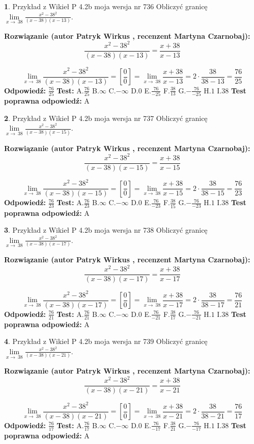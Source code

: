\documentclass[12pt, a4paper]{article}
\theoremstyle{definition} %
\newtheorem{zad}{}
\newcommand{\zadStart}[1]{\begin{zad}#1\newline}
\newcommand{\zadStop}{\end{zad}}
\newcommand{\rozwStart}[2]{\noindent \textbf{Rozwiązanie (autor #1 , recenzent #2): }\newline}
\newcommand{\rozwStop}{\newline}
\newcommand{\odpStart}{\noindent \textbf{Odpowiedź:}\newline}
\newcommand{\odpStop}{\newline}
\newcommand{\testStart}{\noindent \textbf{Test:}\newline}
\newcommand{\testStop}{\newline}
\newcommand{\kluczStart}{\noindent \textbf{Test poprawna odpowiedź:}\newline}
\newcommand{\kluczStop}{\newline}
\begin{document}
\zadStart{Przykład z Wikieł P 4.2b moja wersja nr 736}
Obliczyć granicę $\lim\limits_{x\to\ 38}\frac{x^{2}-38^{2}}{(x-38)(x-13)}$.
\zadStop
\rozwStart{Patryk Wirkus}{Martyna Czarnobaj}
$$\frac{x^{2}-38^{2}}{(x-38)(x-13)}=\frac{x+38}{x-13}$$

$$\lim\limits_{x\to\ 38}\frac{x^{2}-38^{2}}{(x-38)(x-13)}=[\frac{0}{0}]=\lim\limits_{x\to\ 38}\frac{x+38}{x-13}=2 \cdot \frac{38}{38-13} = \frac{76}{25}$$
\rozwStop
\odpStart
$\frac{76}{25}$
\odpStop
\testStart
A.$\frac{76}{25}$
B.$\infty$
C.$-\infty$
D.$0$
E.$\frac{76}{-25}$
F.$\frac{38}{13}$
G.$-\frac{76}{-25}$
H.$1$
I.$38$
\testStop
\kluczStart
A
\kluczStop



\zadStart{Przykład z Wikieł P 4.2b moja wersja nr 737}
Obliczyć granicę $\lim\limits_{x\to\ 38}\frac{x^{2}-38^{2}}{(x-38)(x-15)}$.
\zadStop
\rozwStart{Patryk Wirkus}{Martyna Czarnobaj}
$$\frac{x^{2}-38^{2}}{(x-38)(x-15)}=\frac{x+38}{x-15}$$

$$\lim\limits_{x\to\ 38}\frac{x^{2}-38^{2}}{(x-38)(x-15)}=[\frac{0}{0}]=\lim\limits_{x\to\ 38}\frac{x+38}{x-15}=2 \cdot \frac{38}{38-15} = \frac{76}{23}$$
\rozwStop
\odpStart
$\frac{76}{23}$
\odpStop
\testStart
A.$\frac{76}{23}$
B.$\infty$
C.$-\infty$
D.$0$
E.$\frac{76}{-23}$
F.$\frac{38}{15}$
G.$-\frac{76}{-23}$
H.$1$
I.$38$
\testStop
\kluczStart
A
\kluczStop



\zadStart{Przykład z Wikieł P 4.2b moja wersja nr 738}
Obliczyć granicę $\lim\limits_{x\to\ 38}\frac{x^{2}-38^{2}}{(x-38)(x-17)}$.
\zadStop
\rozwStart{Patryk Wirkus}{Martyna Czarnobaj}
$$\frac{x^{2}-38^{2}}{(x-38)(x-17)}=\frac{x+38}{x-17}$$

$$\lim\limits_{x\to\ 38}\frac{x^{2}-38^{2}}{(x-38)(x-17)}=[\frac{0}{0}]=\lim\limits_{x\to\ 38}\frac{x+38}{x-17}=2 \cdot \frac{38}{38-17} = \frac{76}{21}$$
\rozwStop
\odpStart
$\frac{76}{21}$
\odpStop
\testStart
A.$\frac{76}{21}$
B.$\infty$
C.$-\infty$
D.$0$
E.$\frac{76}{-21}$
F.$\frac{38}{17}$
G.$-\frac{76}{-21}$
H.$1$
I.$38$
\testStop
\kluczStart
A
\kluczStop



\zadStart{Przykład z Wikieł P 4.2b moja wersja nr 739}
Obliczyć granicę $\lim\limits_{x\to\ 38}\frac{x^{2}-38^{2}}{(x-38)(x-21)}$.
\zadStop
\rozwStart{Patryk Wirkus}{Martyna Czarnobaj}
$$\frac{x^{2}-38^{2}}{(x-38)(x-21)}=\frac{x+38}{x-21}$$

$$\lim\limits_{x\to\ 38}\frac{x^{2}-38^{2}}{(x-38)(x-21)}=[\frac{0}{0}]=\lim\limits_{x\to\ 38}\frac{x+38}{x-21}=2 \cdot \frac{38}{38-21} = \frac{76}{17}$$
\rozwStop
\odpStart
$\frac{76}{17}$
\odpStop
\testStart
A.$\frac{76}{17}$
B.$\infty$
C.$-\infty$
D.$0$
E.$\frac{76}{-17}$
F.$\frac{38}{21}$
G.$-\frac{76}{-17}$
H.$1$
I.$38$
\testStop
\kluczStart
A
\kluczStop
\end{document}

